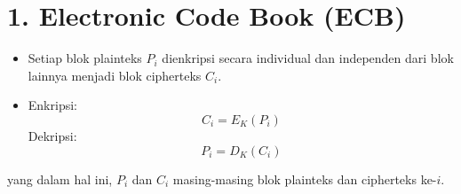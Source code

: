 \documentclass{article}
\begin{document}

\section*{1. Electronic Code Book (ECB)}

\begin{itemize}
    \item Setiap blok plainteks $P_i$ dienkripsi secara individual dan independen dari blok lainnya menjadi blok cipherteks $C_i$.
    \item Enkripsi: \[ C_i = E_K(P_i) \]
    Dekripsi: \[ P_i = D_K(C_i) \]
\end{itemize}

yang dalam hal ini, $P_i$ dan $C_i$ masing-masing blok plainteks dan cipherteks ke-$i$.
\end{document}
